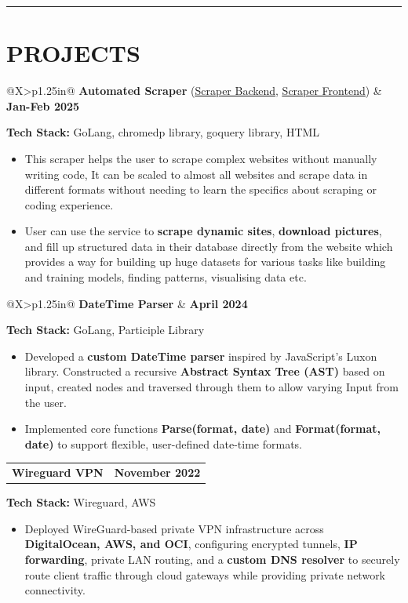 \documentclass[8pt,a4paper]{article}
\makeatletter
\newcommand{\sectionrule}{\noindent\textcolor{resumePurple}{\rule{\linewidth}{0.6pt}}\vspace{1pt}}
\newcommand{\project}[2]{%
  \vspace{1pt}
  \begin{tabularx}{\linewidth}{@{}X>{\raggedleft\arraybackslash}p{1.25in}@{}}
    #1 & \textbf{#2}
  \end{tabularx}
}
\makeatother
\begin{document}
\sectionrule
\newpage
\section*{PROJECTS}

\project{\textbf{Automated Scraper} (\href{https://github.com/ResplenDuck/web-scraper}{\underline{Scraper Backend}}, \href{https://github.com/ResplenDuck/scrape-frontend}{\underline{Scraper Frontend}})}{Jan-Feb 2025}
\textbf{Tech Stack:} GoLang, chromedp library, goquery library, HTML
\begin{itemize}
    \item This scraper helps the user to scrape complex websites without manually writing code, It can be scaled to almost all websites and scrape data in different formats without needing to learn the specifics about scraping or coding experience.
    \item User can use the service to \textbf{scrape dynamic sites}, \textbf{download pictures}, and fill up structured data in their database directly from the website which provides a way for building up huge datasets for various tasks like building and training models, finding patterns, visualising data etc.
\end{itemize}

\project{\textbf{DateTime Parser}}{April 2024}
\textbf{Tech Stack:} GoLang, Participle Library
\begin{itemize}
    \item Developed a \textbf{custom DateTime parser} inspired by JavaScript’s Luxon library. Constructed a recursive \textbf{Abstract Syntax Tree (AST)} based on input, created nodes and traversed through them to allow varying Input from the user.
    \item Implemented core functions \textbf{Parse(format, date)} and \textbf{Format(format, date)} to support flexible, user-defined date-time formats.
\end{itemize}

\project{\textbf{Wireguard VPN}}{November 2022}
\textbf{Tech Stack:} Wireguard, AWS
\begin{itemize}
    \item Deployed WireGuard-based private VPN infrastructure across \textbf{DigitalOcean, AWS, and OCI}, configuring encrypted tunnels, \textbf{IP forwarding}, private LAN routing, and a \textbf{custom DNS resolver} to securely route client traffic through cloud gateways while providing private network connectivity.
\end{itemize}
\end{document}
